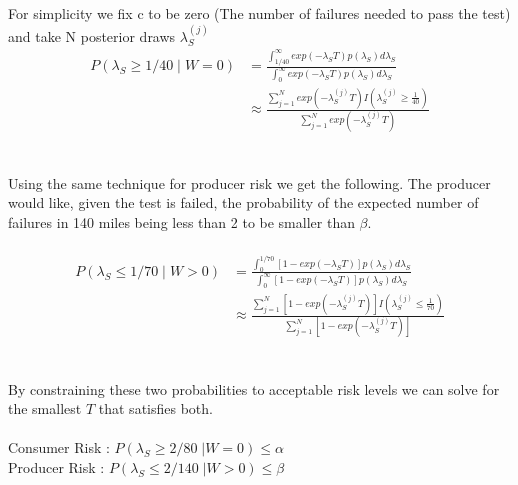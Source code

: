 \documentclass[12pt]{article}
\begin{document}
\\
\\
For simplicity we fix c to be zero (The number of failures needed to pass the
test) and take N posterior draws $ \lambda_S^{(j)} $
$$
\begin{aligned}
	 P(\lambda_S \geq 1/40 \; \vert \; W = 0) &= \frac{\int_{1/40}^{\infty} exp(-\lambda_S T)p(\lambda_S)d\lambda_S} {\int_{0}^{\infty} exp(-\lambda_S T)p(\lambda_S)d\lambda_S} \\
     &\approx \frac{\sum_{j = 1}^{N} exp(-\lambda_S^{(j)} T)I(\lambda_S^{(j)} \geq \frac{1}{40})} {\sum_{j = 1}^{N} exp(-\lambda_S^{(j)} T)}
\end{aligned}
$$
\\
\\
Using the same technique for producer risk we get the following. The producer
would like, given the test is failed, the probability of the expected number of
failures in 140 miles being less than 2 to be smaller than $\beta$.
\\
\\
$$
\begin{aligned}
	 P(\lambda_S \leq 1/70 \; \vert \; W > 0) &= \frac{\int_{0}^{1/70} [1 - exp(-\lambda_S T)]p(\lambda_S)d\lambda_S} {\int_{0}^{\infty} [1 - exp(-\lambda_S T)]p(\lambda_S)d\lambda_S} \\
     &\approx  \frac{\sum_{j = 1}^{N} [1 - exp(-\lambda_S^{(j)} T)] I(\lambda_S^{(j)} \leq \frac{1}{70})} {\sum_{j = 1}^{N} [1 - exp(-\lambda_S^{(j)} T)]}
\end{aligned}
$$
\\
\\
By constraining these two probabilities to acceptable risk levels we can solve
for the smallest $ T $ that satisfies both.
\\
\\
Consumer Risk : $ P(\lambda_S \geq 2/80 \; \vert  W = 0) \leq \alpha $ \\
Producer Risk : $ P(\lambda_S \leq 2/140 \; \vert  W > 0) \leq \beta $
\end{document}
